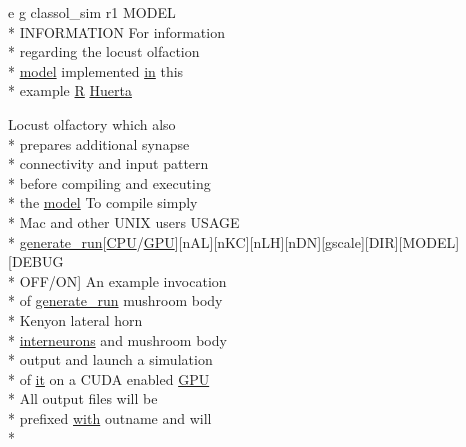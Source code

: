 \begin{DoxyCompactItemize}
e g classol\+\_\+sim r1 M\+O\+D\+E\+L \\*
I\+N\+F\+O\+R\+M\+A\+T\+I\+O\+N For information \\*
regarding the locust olfaction \\*
\hyperlink{README_8txt_a69fd801b7213948c12d9dd7eebb3ed14}{model} implemented \hyperlink{README_8txt_a148897a6b2cc9cff25af80abb13426b0}{in} this \\*
example \hyperlink{gen__syns__sparse__izhModel_8cc_ac06fcc1e53c6b21275aec67047473a28}{R} \hyperlink{userproject_2MBody1__project_2README_8txt_ac704e905c30eac9353bcc26d2526a599}{Huerta}
\item 
Locust olfactory which also \\*
prepares additional synapse \\*
connectivity and input pattern \\*
before compiling and executing \\*
the \hyperlink{README_8txt_a69fd801b7213948c12d9dd7eebb3ed14}{model} To compile simply \\*
Mac and other U\+N\+I\+X users U\+S\+A\+G\+E \\*
\hyperlink{userproject_2MBody__userdef__project_2README_8txt_a320a215d1e27b4de394be70e90d22863}{generate\+\_\+run}\mbox{[}\hyperlink{README_8txt_a74a069e3c75797de2636c4dd14daa147}{C\+P\+U}/\hyperlink{modelSpec_8h_a39cb9803524b6f3b783344b2f89867b4}{G\+P\+U}\mbox{]}\mbox{[}n\+A\+L\mbox{]}\mbox{[}n\+K\+C\mbox{]}\mbox{[}n\+L\+H\mbox{]}\mbox{[}n\+D\+N\mbox{]}\mbox{[}gscale\mbox{]}\mbox{[}D\+I\+R\mbox{]}\mbox{[}M\+O\+D\+E\+L\mbox{]}\mbox{[}D\+E\+B\+U\+G \\*
O\+F\+F/O\+N\mbox{]} An example invocation \\*
of \hyperlink{userproject_2MBody__userdef__project_2README_8txt_a320a215d1e27b4de394be70e90d22863}{generate\+\_\+run} mushroom body \\*
Kenyon lateral horn \\*
\hyperlink{userproject_2SynDelay__project_2README_8txt_adf6327d22e2c11a62a22ab5afd4f2b81}{interneurons} and mushroom body \\*
output and launch a simulation \\*
of \hyperlink{userproject_2PoissonIzh__project_2README_8txt_a3e3bbb6c9b14c38757cf273a117e43e8}{it} on a C\+U\+D\+A enabled \hyperlink{modelSpec_8h_a39cb9803524b6f3b783344b2f89867b4}{G\+P\+U} \\*
All output files will be \\*
prefixed \hyperlink{userproject_2OneComp__project_2README_8txt_ace09bb40fbf4457ad9a9340a67a4fa9a}{with} outname and will \\*

\end{DoxyCompactItemize}
